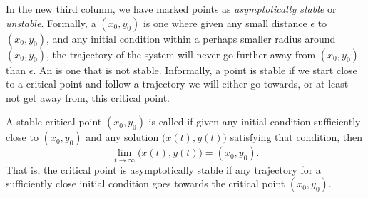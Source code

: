 \documentclass[12pt]{book}
\begin{document}
In the new third column,
we have marked points as \emph{asymptotically stable} or \emph{unstable}.  Formally, a
\emph{} $(x_0,y_0)$ is one where given any small distance $\epsilon$ to
$(x_0,y_0)$, and any initial condition within a perhaps smaller radius
around $(x_0,y_0)$, the trajectory
of the system will never go further away from $(x_0,y_0)$ than $\epsilon$.
An \emph{} is one that is not stable.
Informally, a point is stable if we start close to a critical point and
follow a trajectory we will either go towards, or at least not get away
from,
this critical point.

A stable critical point $(x_0,y_0)$ is called \emph{} if
given any initial condition sufficiently close to $(x_0,y_0)$ and any
solution $\bigl( x(t), y(t) \bigr)$ satisfying that condition, then
\begin{equation*}
\lim_{t \to \infty} \bigl( x(t), y(t) \bigr) = (x_0,y_0) .
\end{equation*}
That is, the critical point is asymptotically stable
if any trajectory for a sufficiently close initial condition
goes towards the critical point $(x_0,y_0)$.
\end{document}
